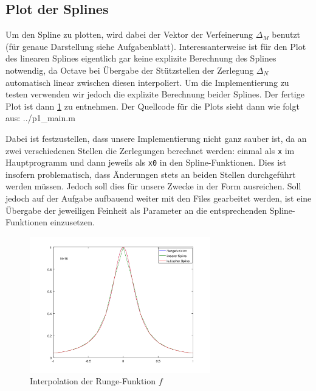 \documentclass[a4paper, 11pt, ngerman]{scrartcl}
\begin{document}
\subsection{Plot der Splines}
\label{sec: plotdersplines}

Um den Spline zu plotten, wird dabei der Vektor der Verfeinerung $\Delta_M$ benutzt (für genaue Darstellung siehe Aufgabenblatt). Interessanterweise ist für den Plot des linearen Splines eigentlich gar keine explizite Berechnung des Splines notwendig, da Octave bei Übergabe der Stützstellen der Zerlegung $\Delta_N$ automatisch linear zwischen diesen interpoliert. Um die Implementierung zu testen verwenden wir jedoch die explizite Berechnung beider Splines. Der fertige Plot ist dann \cref{fig: fplot} zu entnehmen. Der Quellcode für die Plots sieht dann wie folgt aus:
%
%
{../p1_main.m}

Dabei ist festzustellen, dass unsere Implementierung nicht ganz sauber ist, da an zwei verschiedenen Stellen die Zerlegungen berechnet werden: einmal als \texttt{x} im Hauptprogramm und dann jeweils als \texttt{x0} in den Spline-Funktionen. Dies ist insofern problematisch, dass Änderungen stets an beiden Stellen durchgeführt werden müssen. Jedoch soll dies für unsere Zwecke in der Form ausreichen. Soll jedoch auf der Aufgabe aufbauend weiter mit den Files gearbeitet werden, ist eine Übergabe der jeweiligen Feinheit als Parameter an die entsprechenden Spline-Funktionen einzusetzen.

\begin{figure}[htbp] 
	\centering
	\includegraphics[width=0.7\textwidth]{../fplot.png}
	\caption{Interpolation der Runge-Funktion $f$}
	\label{fig: fplot}
\end{figure}
\end{document}
